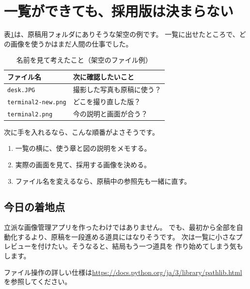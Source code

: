 \section{一覧ができても、採用版は決まらない}
表\ref{tab:image-candidates}は、原稿用フォルダにありそうな架空の例です。
一覧に出せたところで、どの画像を使うかはまだ人間の仕事でした。

\begin{table}[htbp]
  \centering
  \caption{名前を見て考えたこと（架空のファイル例）}
  \label{tab:image-candidates}
  \begin{tabular}{ll}
    \toprule
    ファイル名 & 次に確認したいこと \\
    \midrule
    \texttt{desk.JPG} & 撮影した写真も原稿に使う？ \\
    \texttt{terminal2-new.png} & どこを撮り直した版？ \\
    \texttt{terminal2.png} & 今の説明と画面が合う？ \\
    \bottomrule
  \end{tabular}
\end{table}

次に手を入れるなら、こんな順番がよさそうです。
\begin{enumerate}
  \item 一覧の横に、使う章と図の説明をメモする。
  \item 実際の画面を見て、採用する画像を決める。
  \item ファイル名を変えるなら、原稿中の参照先も一緒に直す。
\end{enumerate}

\subsection{今日の着地点}
立派な画像管理アプリを作ったわけではありません。
でも、最初から全部を自動化するより、原稿を一段進める道具にはなりそうです。
次は一覧に小さなプレビューを付けたい。そうなると、結局もう一つ道具を
作り始めてしまう気もします。

ファイル操作の詳しい仕様は\url{https://docs.python.org/ja/3/library/pathlib.html}
を参照してください。
